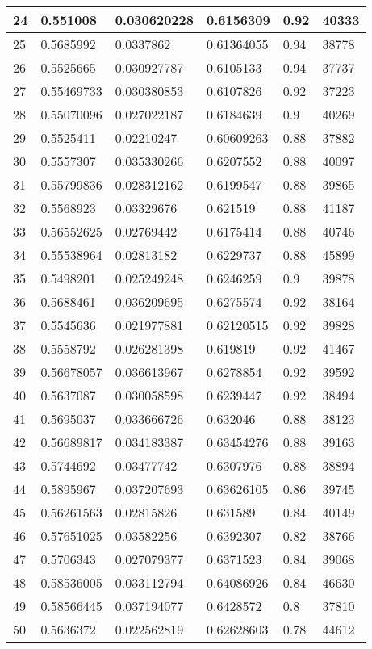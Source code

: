 \begin{longtable}{|l|l|l|l|l|l|}
24 & 0.551008 & 0.030620228 & 0.6156309 & 0.92 & 40333 \\ \hline 
25 & 0.5685992 & 0.0337862 & 0.61364055 & 0.94 & 38778 \\ \hline 
26 & 0.5525665 & 0.030927787 & 0.6105133 & 0.94 & 37737 \\ \hline 
27 & 0.55469733 & 0.030380853 & 0.6107826 & 0.92 & 37223 \\ \hline 
28 & 0.55070096 & 0.027022187 & 0.6184639 & 0.9 & 40269 \\ \hline 
29 & 0.5525411 & 0.02210247 & 0.60609263 & 0.88 & 37882 \\ \hline 
30 & 0.5557307 & 0.035330266 & 0.6207552 & 0.88 & 40097 \\ \hline 
31 & 0.55799836 & 0.028312162 & 0.6199547 & 0.88 & 39865 \\ \hline 
32 & 0.5568923 & 0.03329676 & 0.621519 & 0.88 & 41187 \\ \hline 
33 & 0.56552625 & 0.02769442 & 0.6175414 & 0.88 & 40746 \\ \hline 
34 & 0.55538964 & 0.02813182 & 0.6229737 & 0.88 & 45899 \\ \hline 
35 & 0.5498201 & 0.025249248 & 0.6246259 & 0.9 & 39878 \\ \hline 
36 & 0.5688461 & 0.036209695 & 0.6275574 & 0.92 & 38164 \\ \hline 
37 & 0.5545636 & 0.021977881 & 0.62120515 & 0.92 & 39828 \\ \hline 
38 & 0.5558792 & 0.026281398 & 0.619819 & 0.92 & 41467 \\ \hline 
39 & 0.56678057 & 0.036613967 & 0.6278854 & 0.92 & 39592 \\ \hline 
40 & 0.5637087 & 0.030058598 & 0.6239447 & 0.92 & 38494 \\ \hline 
41 & 0.5695037 & 0.033666726 & 0.632046 & 0.88 & 38123 \\ \hline 
42 & 0.56689817 & 0.034183387 & 0.63454276 & 0.88 & 39163 \\ \hline 
43 & 0.5744692 & 0.03477742 & 0.6307976 & 0.88 & 38894 \\ \hline 
44 & 0.5895967 & 0.037207693 & 0.63626105 & 0.86 & 39745 \\ \hline 
45 & 0.56261563 & 0.02815826 & 0.631589 & 0.84 & 40149 \\ \hline 
46 & 0.57651025 & 0.03582256 & 0.6392307 & 0.82 & 38766 \\ \hline 
47 & 0.5706343 & 0.027079377 & 0.6371523 & 0.84 & 39068 \\ \hline 
48 & 0.58536005 & 0.033112794 & 0.64086926 & 0.84 & 46630 \\ \hline 
49 & 0.58566445 & 0.037194077 & 0.6428572 & 0.8 & 37810 \\ \hline 
50 & 0.5636372 & 0.022562819 & 0.62628603 & 0.78 & 44612 \\ \hline 
\end{longtable}